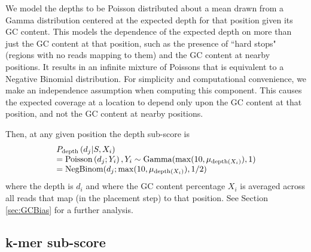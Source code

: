 \documentclass[phd,tocprelim]{cornell}
\begin{document}
We model the depths to be Poisson distributed about a mean drawn from a Gamma distribution centered at the expected depth for that position given its GC content. This models the dependence of the expected depth on more than just the GC content at that position, such as the presence of ``hard stops" (regions with no reads mapping to them) and the GC content at nearby positions. It results in an infinite mixture of Poissons that is equivalent to a Negative Binomial distribution. For simplicity and computational convenience, we make an independence assumption when computing this component.  This causes the expected coverage at a location to depend only upon the GC content at that position, and not the GC content at nearby positions.

Then, at any given position the depth sub-score is
\begin{equation}
    \begin{array}{l}
        P_{\text{depth}}\left(d_{j}|S,X_{i}\right) \\
        = {\rm Poisson}\left(d_{j};Y_{i}\right), Y_{i} \sim {\rm Gamma}(\max(10,\mu_{\text{depth}(X_{i})}), 1) \\
        = {\rm NegBinom}(d_{j}; \max(10, \mu_{\text{depth}(X_{i})}), 1/2)
    \end{array}
\end{equation}
where the depth is $d_{i}$ and where the GC content percentage $X_{i}$ is averaged across all reads that map (in the placement step) to that position. See Section \ref{sec:GCBias} for a further analysis.


\subsection{k-mer sub-score} %
\label{sub:kmersubscore}
\end{document}
